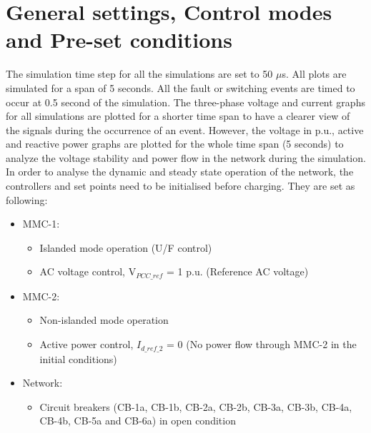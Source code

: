 \section{General settings, Control modes and Pre-set conditions}
The simulation time step for all the simulations are set to 50 $\mu$s. All plots are simulated for a span of 5 seconds. All the fault or switching events are timed to occur at 0.5 second of the simulation. The three-phase voltage and current graphs for all simulations are plotted for a shorter time span to have a clearer view of the signals during the occurrence of an event. However, the voltage in p.u., active and reactive power graphs are plotted for the whole time span (5 seconds) to analyze the voltage stability and power flow in the network during the simulation. In order to analyse the dynamic and steady state operation of the network, the controllers and set points need to be initialised before charging. They are set as following:

\begin{itemize}
    \item \gls{MMC}-1:
    \begin{itemize}
        \item Islanded mode operation (U/F control)
        \item \gls{AC} voltage control, V$_{PCC\_{ref}}$ = 1 p.u. (Reference \gls{AC} voltage)
    \end{itemize}
\end{itemize}

\begin{itemize}
    \item \gls{MMC}-2:
    \begin{itemize}
        \item Non-islanded mode operation
        \item Active power control, $I_{d\_ref\_2}$ = 0 (No power flow through \gls{MMC}-2 in the initial conditions)
    \end{itemize}
\end{itemize}

\begin{itemize}
    \item Network:
    \begin{itemize}
        \item Circuit breakers (CB-1a, CB-1b, CB-2a, CB-2b, CB-3a, CB-3b, CB-4a, CB-4b, CB-5a and CB-6a) in open condition
    \end{itemize}
\end{itemize}

